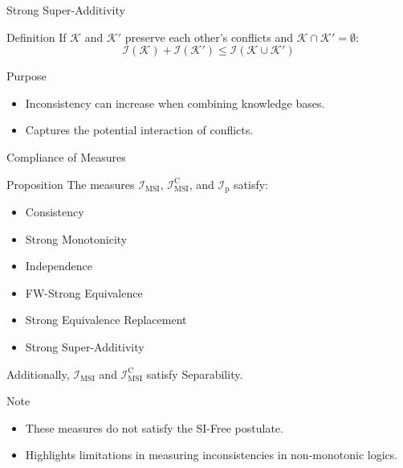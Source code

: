 \begin{frame}{Strong Super-Additivity}
    \begin{block}{Definition}
        If \(\mathcal{K}\) and \(\mathcal{K}'\) preserve each other's conflicts and \(\mathcal{K} \cap \mathcal{K}' = \emptyset\):
        \[
            \mathcal{I}(\mathcal{K}) + \mathcal{I}(\mathcal{K}') \leq \mathcal{I}(\mathcal{K} \cup \mathcal{K}')
        \]
    \end{block}
    \begin{block}{Purpose}
        \begin{itemize}
            \item Inconsistency can increase when combining knowledge bases.
            \item Captures the potential interaction of conflicts.
        \end{itemize}
    \end{block}
\end{frame}

\begin{frame}{Compliance of Measures}
    \begin{block}{Proposition}
        The measures \(\mathcal{I}_{\text{MSI}}\), \(\mathcal{I}_{\text{MSI}}^\text{C}\), and \(\mathcal{I}_{\text{p}}\) satisfy:

        \begin{itemize}
            \item Consistency
            \item Strong Monotonicity
            \item Independence
            \item FW-Strong Equivalence
            \item Strong Equivalence Replacement
            \item Strong Super-Additivity
        \end{itemize}

        Additionally, \(\mathcal{I}_{\text{MSI}}\) and \(\mathcal{I}_{\text{MSI}}^\text{C}\) satisfy Separability.
    \end{block}
    \begin{alertblock}{Note}
        \begin{itemize}
            \item These measures do not satisfy the SI-Free postulate.
            \item Highlights limitations in measuring inconsistencies in non-monotonic logics.
        \end{itemize}
    \end{alertblock}
\end{frame}


